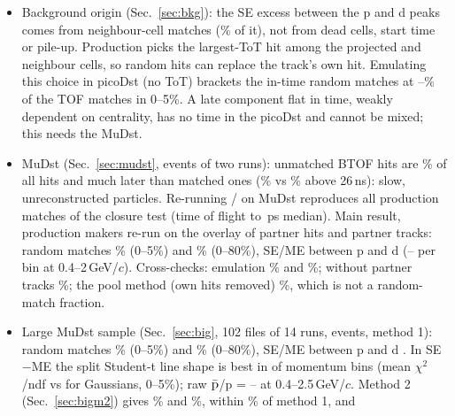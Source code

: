 \begin{itemize}
  the same-event $m^2$ reproduces production (RMS difference \mtDmRmsVthree\,GeV$^2$/$c^4$). Mixed events overlaid on the
  track's own event, normalized per projected track and including hits without stored time, give random matches equal to
  \mtMENormFracCiVthree\% of the TOF matches in 0--5\% and \mtMENormFracCaVthree\% in 70--80\%. In 0--5\% at $0.8<p<1$\,\GeVc{}
  they are \mtFrPiMidCiVthree\% ($\pi$), \mtFrKMidCiVthree\% (K) and \mtFrPMidCiVthree\% (p) of the yield under the peaks.
  They explain only a small part of the SE yield between the proton and deuteron peaks (SE/ME = \mtSbRatioAllVthree).
\item Background origin (Sec.~\ref{sec:bkg}): the SE excess between the p and d peaks comes from neighbour-cell matches
  (\nbShareHI\% of it), not from dead cells, start time or pile-up. Production picks the largest-ToT hit among the projected
  and neighbour cells, so random hits can replace the track's own hit. Emulating this choice in picoDst (no ToT) brackets the
  in-time random matches at \mtMENormFracCiVeight--\mtMENormFracCiVseven\% of the TOF matches in 0--5\%. A late component flat in
  time, weakly dependent on centrality, has no time in the picoDst and cannot be mixed; this needs the MuDst.
\item MuDst (Sec.~\ref{sec:mudst}, \ovEvMtwo{} events of two runs): unmatched BTOF hits are \prUnmatchedFrac\% of all hits
  and much later than matched ones (\prUlate\% vs \prMlate\% above 26\,ns): slow, unreconstructed particles. Re-running
  / on MuDst reproduces all \clNSame{} production matches of the closure test
  (time of flight to \clDtofMed\,ps median). Main result, production makers re-run on the overlay of partner hits and
  partner tracks: random matches \ovtFrCi\% (0--5\%) and \ovtFrAll\% (0--80\%), SE/ME between p and d \ovtHiCi{}
  (\ovtHiMinCi--\ovtHiMaxCi{} per bin at 0.4--2\,GeV/$c$). Cross-checks: emulation \muFrProdCi\% and \muFrProdAll\%;
  without partner tracks \ovFrCi\%; the pool method (own hits removed) \poolFrCi\%, which is not a random-match fraction.
\item Large MuDst sample (Sec.~\ref{sec:big}, 102 files of 14 runs, \mubigEvMtwo{} events, method 1): random matches
  \mubigFrProdCi\% (0--5\%) and \mubigFrProdAll\% (0--80\%), SE/ME between p and d \mubigHiProdCi. In SE$-$ME the split Student-t
  line shape is best in \bigFitTtwoBestCi{} of \bigFitNbinsCi{} momentum bins (mean $\chi^2$/ndf \bigFitChiTtwoCi{} vs \bigFitChiGCi{}
  for Gaussians, 0--5\%); raw $\bar{\rm p}$/p = \bigRatPMin--\bigRatPMax{} at 0.4--2.5\,GeV/$c$. Method 2 (Sec.~\ref{sec:bigm2}) gives \ovbigFrCi\% and \ovbigFrAll\%, within \bigTwoOneFrDev\% of method 1, and

\end{itemize}
